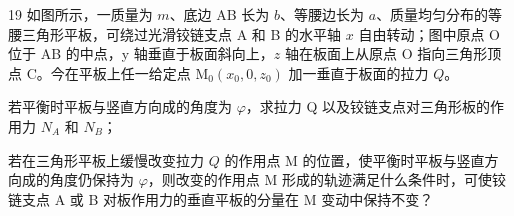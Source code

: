 \begin{problem}[第31届全国中学生物理竞赛复赛][等腰三角形平板平衡]{19}
如图所示，一质量为 $m$、底边 AB 长为 $b$、等腰边长为 $a$、质量均匀分布的等腰三角形平板，可绕过光滑铰链支点 A 和 B 的水平轴 $x$ 自由转动；图中原点 O 位于 AB 的中点，y 轴垂直于板面斜向上，$z$ 轴在板面上从原点 O 指向三角形顶点 C。今在平板上任一给定点 $\mathrm{M}_0(x_0,0,z_0)$ 加一垂直于板面的拉力 $Q$。
    \begin{subproblem}
        若平衡时平板与竖直方向成的角度为 $\varphi$，求拉力 Q 以及铰链支点对三角形板的作用力 $N_A$ 和 $N_B$；
    \end{subproblem}
    \begin{subproblem}
        若在三角形平板上缓慢改变拉力 $Q$ 的作用点 M 的位置，使平衡时平板与竖直方向成的角度仍保持为 $\varphi$，则改变的作用点 M 形成的轨迹满足什么条件时，可使铰链支点 A 或 B 对板作用力的垂直平板的分量在 M 变动中保持不变？
    \end{subproblem}
\end{problem}